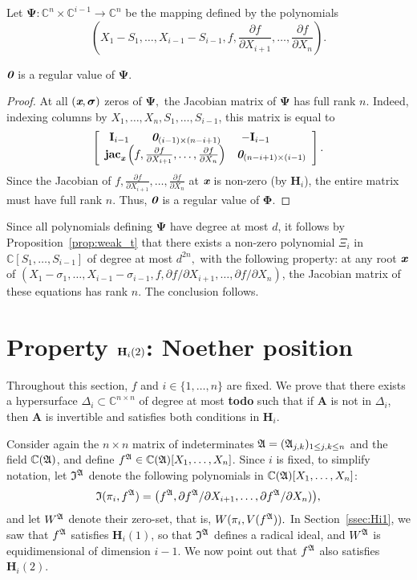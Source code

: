 \documentclass[sigconf]{acmart}
\def\td{{\bf todo}}
\def\bz{\textit{\textbf{0}}}
\def\mA{{\bm A}}
\def\xb{\textit{\textbf{x}}}
\def\C{\mathbb{C}}
\def\jac{ \textbf{jac}}
\def\bI{\textbf{I}}
\def\pa{\partial}
\def\D{\Delta}
\def\I{\frak{I}}
\def\A{\frak{A}}
\begin{document}
Let $\bm\Psi: \C^n \times \C^{i-1} \rightarrow \C^{n}$ be the mapping defined by the polynomials
\[
  (X_1-S_1,\hdots,X_{i-1}-S_{i-1}, f,\frac{\pa f}{\pa X_{i+1}},\hdots,\frac{\pa f}{\pa X_n} ).
\]
%
\begin{lemma}
  $\bz$ is a regular value of $\bm\Psi.$
\end{lemma}
\begin{proof}
At all $(\xb,\bm\sigma)$ zeros of $\bm\Psi,$ the Jacobian matrix of
$\bm\Psi$ has full rank $n$. Indeed, indexing columns 
by $X_1,\dots,X_n,S_1,\dots,S_{i-1}$, this matrix is equal to
\[
\left[ 
\begin{array}{cc}
\bI_{i-1}\hspace{7mm} \bz_{(i-1)\times (n-i+1)}&\hspace{-10mm}-\bI_{i-1}\\
\jac_{\xb}\left(f,\frac{\pa
  f}{\pa X_{i+1}},\hdots,\frac{\pa f}{\pa X_n}\right)&\bz_{(n-i+1)\times (i-1)}
\end{array}
\right].
\] 
Since the Jacobian of $f,\frac{\pa f}{\pa X_{i+1}},\hdots,\frac{\pa
  f}{\pa X_n}$ at $\xb$ is non-zero (by $\textbf{H}_i$), the entire
matrix must have full rank $n$. Thus,  $\bz$ is a regular value of $\bm\Phi.$
\end{proof}
%
Since all polynomials defining $\bm\Psi$ have degree at most $d$, it
follows by Proposition~\ref{prop:weak_t} that there exists a non-zero
polynomial $\Xi_i$ in $\C[S_1,\dots,S_{i-1}]$ of degree at most
$d^{2n},$ with the following property: at any root $\xb$ of
$(X_1-\sigma_1,\dots,X_{i-1}-\sigma_{i-1},f, {\pa f}/{\pa
  X_{i+1}},\dots,{\pa f}/{\pa X_n})$, the Jacobian matrix of these
equations has rank $n$. The conclusion follows.


\section{Property ${\bf H}_i(2)$: Noether position}\label{sec:Hi2}

Throughout this section, $f$ and $i \in \{1,\hdots,n\}$ are fixed. We
prove that there exists a hypersurface $\D_{i} \subset \C^{n\times
  n}$ of degree at most \td{} such that if $\mA$ is not in $\D_{i}$,
then $\mA$ is invertible and satisfies both conditions in
$\textbf{H}_i$.

Consider again the $n\times n$ matrix of indeterminates
$\A=(\A_{j,k})_{1 \le j,k \le n}$ and the field $\C(\A)$,
and define $f^{\A} \in \C(\A)[X_1,\dots,X_n]$.  Since $i$ is fixed, to
simplify notation, let $\I^\A$ denote the following polynomials in
$\C(\A)[X_1,\dots,X_n]$:
$$\I(\pi_i,f^\A)= \big (f^\A, {\pa f^\A}/{\pa X_{i+1}},\dots,{\pa
  f^\A}/{\pa X_n}) \big ),$$ and let $W^\A$ denote their zero-set,
that is, $W(\pi_i,V(f^\A)).$ In Section~\ref{ssec:Hi1}, we saw that
$f^\A$ satisfies $\textbf{H}_i(1)$, so that $\I^\A$ defines a
radical ideal, and $W^\A$ is equidimensional of dimension $i-1$. We
now point out that $f^\A$ also satisfies $\textbf{H}_i(2)$.
\end{document}
